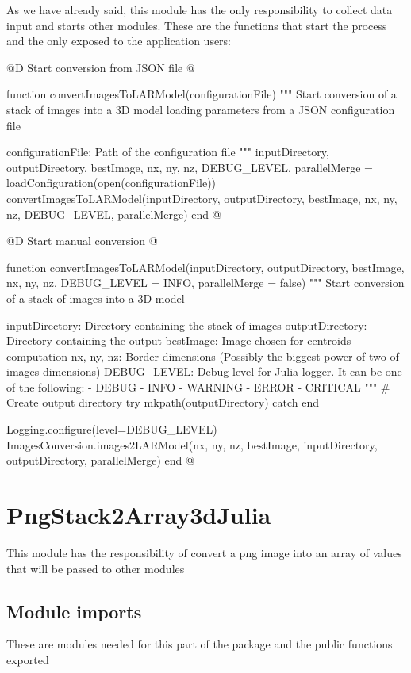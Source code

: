 \documentclass[11pt,oneside]{article}	%
\begin{document}
As we have already said, this module has the only responsibility to collect data input and starts other modules. These are the functions that start the process and the only exposed to the application users:

@D Start conversion from JSON file
@{function convertImagesToLARModel(configurationFile)
  """
  Start conversion of a stack of images into a 3D model
  loading parameters from a JSON configuration file

  configurationFile: Path of the configuration file
  """
  inputDirectory, outputDirectory, bestImage, nx, ny, nz,
      DEBUG_LEVEL, parallelMerge = loadConfiguration(open(configurationFile))
  convertImagesToLARModel(inputDirectory, outputDirectory, bestImage,
			nx, ny, nz, DEBUG_LEVEL, parallelMerge)
end
@}

@D Start manual conversion
@{function convertImagesToLARModel(inputDirectory, outputDirectory, bestImage,
                                 nx, ny, nz, DEBUG_LEVEL = INFO, parallelMerge = false)
  """
  Start conversion of a stack of images into a 3D model

  inputDirectory: Directory containing the stack of images
  outputDirectory: Directory containing the output
  bestImage: Image chosen for centroids computation
  nx, ny, nz: Border dimensions (Possibly the biggest power of two of images dimensions)
  DEBUG_LEVEL: Debug level for Julia logger. It can be one of the following:
    - DEBUG
    - INFO
    - WARNING
    - ERROR
    - CRITICAL
  """
  # Create output directory
  try
    mkpath(outputDirectory)
  catch
  end

  Logging.configure(level=DEBUG_LEVEL)
  ImagesConversion.images2LARModel(nx, ny, nz, bestImage,
	  inputDirectory, outputDirectory, parallelMerge)
end
@}

\section{PngStack2Array3dJulia}\label{sec:PngStack2Array3dJulia}

This module has the responsibility of convert a png image into an array of values
that will be passed to other modules

\subsection{Module imports}\label{sec:imports}
These are modules needed for this part of the package and the public functions exported
\end{document}
